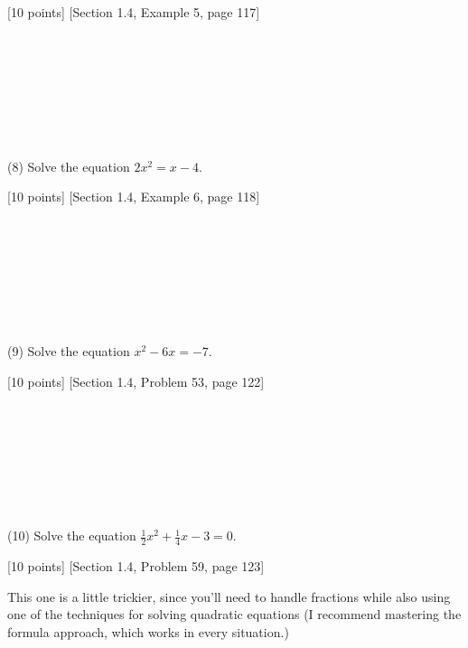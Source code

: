 \documentclass{article}
\begin{document}
[10 points] [Section 1.4, Example 5, page 117]\\\\\\\\\\\\\\\


(8) Solve the equation $2x^2 = x - 4$.

[10 points] [Section 1.4, Example 6, page 118]\\\\\\\\\\\\\\\





(9) Solve the equation $x^2 -6x = -7$.

[10 points] [Section 1.4, Problem 53, page 122]\\\\\\\\\\\\\\\



(10) Solve the equation $\frac{1}{2}x^2 +\frac{1}{4}x - 3 = 0$.

[10 points] [Section 1.4, Problem 59, page 123]

This one is a little trickier, since you'll need to handle fractions while also using one of the techniques for solving quadratic equations (I recommend mastering the formula approach, which works in every situation.)\\\\\\\\\\\\\\\
\end{document}
